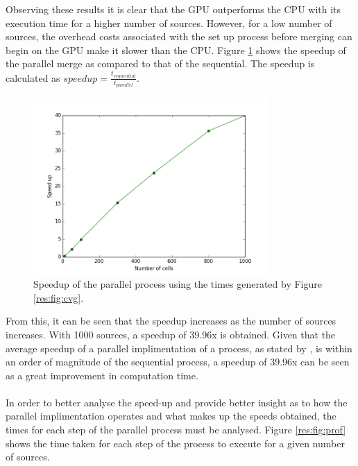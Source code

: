 Observing these results it is clear that the GPU outperforms the CPU with its execution time for a higher number of sources. However, for a low number of sources, the overhead costs associated with the set up process before merging can begin on the GPU make it slower than the CPU. Figure \ref{res:fig:speed} shows the speedup of the parallel merge as compared to that of the sequential. The speedup is calculated as $speedup = \frac{t_{sequential}}{t_{parallel}}$.
\begin{figure}[H]
\centering
\includegraphics[width=0.8\textwidth]{Images/result_speed.png}
\caption{Speedup of the parallel process using the times generated by Figure \ref{res:fig:cvg}.}
\label{res:fig:speed}
\end{figure}
From this, it can be seen that the speedup increases as the number of sources increases. With 1000 sources, a speedup of 39.96x is obtained. Given that the average speedup of a parallel implimentation of a process, as stated by \citep{lee2010debunking}, is within an order of magnitude of the sequential process, a speedup of 39.96x can be seen as a great improvement in computation time. 
\\
\\
In order to better analyse the speed-up and provide better insight as to how the parallel implimentation operates and what makes up the speeds obtained, the times for each step of the parallel process must be analysed. Figure \ref{res:fig:prof} shows the time taken for each step of the process to execute for a given number of sources.
